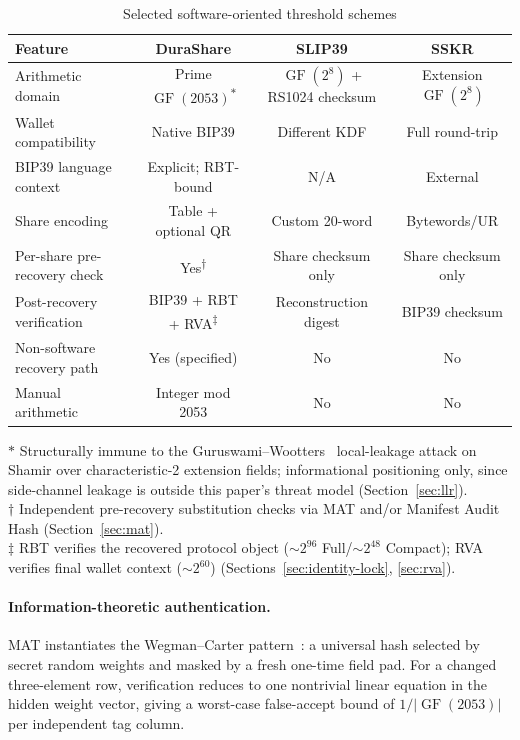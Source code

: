 \documentclass[11pt]{article}
\newcommand{\GF}{\operatorname{GF}}
\begin{document}
\begin{table}[H]
\centering
\caption{Selected software-oriented threshold schemes}
\label{tab:electronic}
\footnotesize
\begin{tabular}{@{}lccc@{}}
\toprule
\textbf{Feature} & \textbf{DuraShare} & \textbf{SLIP39} & \textbf{SSKR} \\ \midrule
Arithmetic domain & Prime $\GF(2053)$\textsuperscript{$\ast$} & $\GF(2^8)$ + RS1024 checksum & Extension $\GF(2^8)$ \\
Wallet compatibility & Native BIP39 & Different KDF & Full round-trip \\
BIP39 language context & Explicit; RBT-bound & N/A & External \\
Share encoding & Table + optional QR & Custom 20-word & Bytewords/UR \\
Per-share pre-recovery check & Yes\textsuperscript{$\dagger$} & Share checksum only & Share checksum only \\
Post-recovery verification & BIP39 + RBT + RVA\textsuperscript{$\ddagger$} & Reconstruction digest & BIP39 checksum \\
Non-software recovery path & Yes (specified) & No & No \\
Manual arithmetic & Integer mod 2053 & No & No \\
\bottomrule
\end{tabular}

\medskip
\footnotesize
$\ast$ Structurally immune to the Guruswami--Wootters~\cite{guruswamiwootters2016} local-leakage attack on Shamir over characteristic-2 extension fields; informational positioning only, since side-channel leakage is outside this paper's threat model (Section~\ref{sec:llr}).\\
$\dagger$ Independent pre-recovery substitution checks via MAT and/or Manifest Audit Hash (Section~\ref{sec:mat}).\\
$\ddagger$ RBT verifies the recovered protocol object (${\sim}2^{96}$ Full/${\sim}2^{48}$ Compact); RVA verifies final wallet context (${\sim}2^{60}$) (Sections~\ref{sec:identity-lock}, \ref{sec:rva}).
\end{table}

\paragraph{Information-theoretic authentication.} MAT instantiates the Wegman--Carter pattern~\cite{wegmancarter1981}: a universal hash selected by secret random weights and masked by a fresh one-time field pad. For a changed three-element row, verification reduces to one nontrivial linear equation in the hidden weight vector, giving a worst-case false-accept bound of $1/|\GF(2053)|$ per independent tag column.
\end{document}
